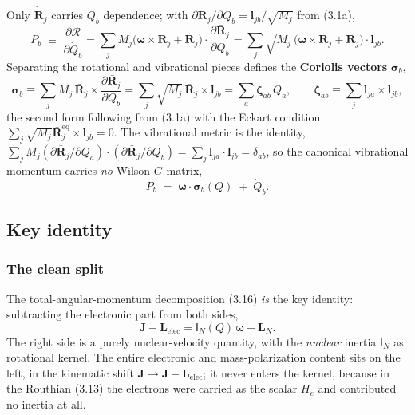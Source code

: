 Only $\dot{\bar{\mathbf{R}}}_j$ carries $\dot Q_b$ dependence; with $\partial\bar{\mathbf{R}}_j/\partial Q_b=\mathbf{l}_{jb}/\sqrt{M_j}$ from (3.1a),
\begin{equation}
P_b\;\equiv\;\frac{\partial \mathcal{R}}{\partial\dot Q_b}=\sum_jM_j\bigl(\boldsymbol{\omega}\!\times\!\bar{\mathbf{R}}_j+\dot{\bar{\mathbf{R}}}_j\bigr)\!\cdot\!\frac{\partial\bar{\mathbf{R}}_j}{\partial Q_b}=\sum_j\sqrt{M_j}\,\bigl(\boldsymbol{\omega}\!\times\!\bar{\mathbf{R}}_j+\dot{\bar{\mathbf{R}}}_j\bigr)\!\cdot\!\mathbf{l}_{jb}. \tag{3.17}
\end{equation}
Separating the rotational and vibrational pieces defines the \textbf{Coriolis vectors} $\boldsymbol{\sigma}_b$,
\begin{equation}
\boldsymbol{\sigma}_b \equiv \sum_jM_j\,\bar{\mathbf{R}}_j\!\times\!\frac{\partial\bar{\mathbf{R}}_j}{\partial Q_b}=\sum_j\sqrt{M_j}\,\bar{\mathbf{R}}_j\!\times\!\mathbf{l}_{jb}=\sum_a\boldsymbol{\zeta}_{ab}\,Q_a,\qquad \boldsymbol{\zeta}_{ab}\equiv\sum_j\mathbf{l}_{ja}\!\times\!\mathbf{l}_{jb}, \tag{3.17a}
\end{equation}
the second form following from (3.1a) with the Eckart condition $\sum_j\sqrt{M_j}\bar{\mathbf{R}}_j^{\mathrm{eq}}\!\times\!\mathbf{l}_{jb}=0$. The vibrational metric is the identity, $\sum_jM_j(\partial\bar{\mathbf{R}}_j/\partial Q_a)\!\cdot\!(\partial\bar{\mathbf{R}}_j/\partial Q_b)=\sum_j\mathbf{l}_{ja}\!\cdot\!\mathbf{l}_{jb}=\delta_{ab}$, so the canonical vibrational momentum carries \emph{no} Wilson $G$-matrix,
\begin{equation}
P_b \;=\; \boldsymbol{\omega}\!\cdot\!\boldsymbol{\sigma}_b(Q) \;+\; \dot Q_b. \tag{3.17b}
\end{equation}

\subsection{Key identity}

\subsubsection{The clean split}

The total-angular-momentum decomposition (3.16) \emph{is} the key identity: subtracting the electronic part from both sides,
\begin{equation}
\boxed{\;\mathbf{J}-\mathbf{L}_{\mathrm{elec}}=\mathsf{I}_N(Q)\,\boldsymbol{\omega}+\mathbf{L}_N.\;} \tag{3.19}
\end{equation}
The right side is a purely nuclear-velocity quantity, with the \emph{nuclear} inertia $\mathsf{I}_N$ as rotational kernel. The entire electronic and mass-polarization content sits on the left, in the kinematic shift $\mathbf{J}\to\mathbf{J}-\mathbf{L}_{\mathrm{elec}}$; it never enters the kernel, because in the Routhian (3.13) the electrons were carried as the scalar $H_e$ and contributed no inertia at all.


